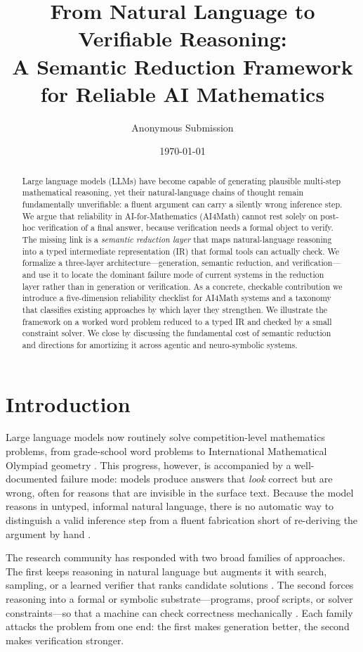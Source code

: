 \documentclass[11pt]{article}
\title{\bfseries From Natural Language to Verifiable Reasoning:\\ A Semantic Reduction Framework for Reliable AI Mathematics}
\author{Anonymous Submission}
\date{\today}
\begin{document}
\maketitle

\begin{abstract}
Large language models (LLMs) have become capable of generating plausible multi-step mathematical reasoning, yet their natural-language chains of thought remain fundamentally unverifiable: a fluent argument can carry a silently wrong inference step. We argue that reliability in AI-for-Mathematics (AI4Math) cannot rest solely on post-hoc verification of a final answer, because verification needs a formal object to verify. The missing link is a \emph{semantic reduction layer} that maps natural-language reasoning into a typed intermediate representation (IR) that formal tools can actually check. We formalize a three-layer architecture---generation, semantic reduction, and verification---and use it to locate the dominant failure mode of current systems in the reduction layer rather than in generation or verification. As a concrete, checkable contribution we introduce a five-dimension reliability checklist for AI4Math systems and a taxonomy that classifies existing approaches by which layer they strengthen. We illustrate the framework on a worked word problem reduced to a typed IR and checked by a small constraint solver. We close by discussing the fundamental cost of semantic reduction and directions for amortizing it across agentic and neuro-symbolic systems.
\end{abstract}

\section{Introduction}
Large language models now routinely solve competition-level mathematics problems, from grade-school word problems to International Mathematical Olympiad geometry \cite{trinh2024alphageometry}. This progress, however, is accompanied by a well-documented failure mode: models produce answers that \emph{look} correct but are wrong, often for reasons that are invisible in the surface text. Because the model reasons in untyped, informal natural language, there is no automatic way to distinguish a valid inference step from a fluent fabrication short of re-deriving the argument by hand \cite{hendrycks2021math,lewkowycz2022minerva}.

The research community has responded with two broad families of approaches. The first keeps reasoning in natural language but augments it with search, sampling, or a learned verifier that ranks candidate solutions \cite{wei2022cot,cobbe2021gsm8k}. The second forces reasoning into a formal or symbolic substrate---programs, proof scripts, or solver constraints---so that a machine can check correctness mechanically \cite{gao2023pal,chen2022pot,moura2015lean}. Each family attacks the problem from one end: the first makes generation better, the second makes verification stronger.
\end{document}
